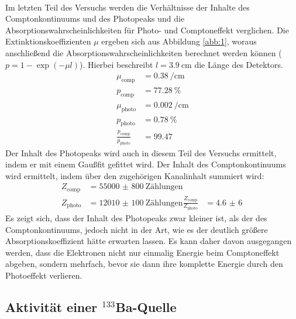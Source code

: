 \\
\noindent Im letzten Teil des Versuchs werden die Verhältnisse der Inhalte des Comptonkontinuums und des Photopeaks und die Absorptionswahrscheinlichkeiten für Photo- und Comptoneffekt verglichen.
Die Extinktionskoeffizienten $\mu$ ergeben sich aus Abbildung \ref{abb:1}, woraus anschließend die Absorptionswahrscheinlichkeiten berechnet werden können ($p = 1-\exp(-\mu l)$). Hierbei beschreibt $l= \SI{3,9}{\centi \meter}$ die Länge des Detektors.
\begin{align*}
    \mu_{\text{comp}} &= \SI{0,38}{\per \centi \meter} \\
    p_{\text{comp}} &= \SI{77,28}{\percent}\\
    \mu_{\text{photo}} &= \SI{0,002}{\per \centi \meter} \\
    p_{\text{photo}} &= \SI{0,78}{\percent} \\
    \frac{p_{\text{comp}}}{p_{\text{photo}}} &= \SI{99,47}{}
\end{align*}
Der Inhalt des Photopeaks wird auch in diesem Teil des Versuchs ermittelt, indem er mit einem Gaußfit gefittet wird. Der Inhalt des Comptonkontinuums wird ermittelt, indem über den zugehörigen Kanalinhalt summiert wird:
\begin{align*}
    Z_{\text{comp}}  &= \SI{55000(800)}{\text{Zählungen}} \\
    Z_{\text{photo}} &= \SI{12010(100)}{\text{Zählungen}}
    \frac{Z_{\text{comp}}}{Z_{\text{photo}}} &= \SI{4,6(6)}{}
\end{align*}
Es zeigt sich, dass der Inhalt des Photopeaks zwar kleiner ist, als der des
Comptonkontinuums, jedoch nicht in der Art, wie es der deutlich größere Absorptionskoeffizient hätte erwarten lassen.
Es kann daher davon ausgegangen werden, dass die Elektronen nicht nur einmalig Energie beim Comptoneffekt abgeben, sondern mehrfach, bevor sie dann ihre komplette Energie durch den Photoeffekt verlieren.


\subsection{Aktivität einer $^{133}$Ba-Quelle}

